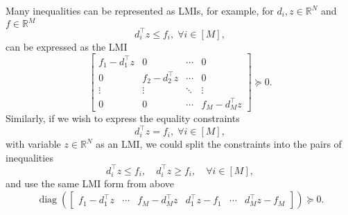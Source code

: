 \documentclass[a4paper]{article}
\DeclareMathOperator{\diag}{diag}
\begin{document}
Many inequalities can be represented as LMIs, for example, for $d_i,z\in\mathbb{R}^N$ and $f\in\mathbb{R}^M$
\begin{equation*}
d_i^\top z \le f_i,\;\forall i\in[M],
\end{equation*}
can be expressed as the LMI
\begin{equation*}
\begin{bmatrix}
f_1 - d_1^\top z &       0          & \cdots &    0   \\
      0          & f_2 - d_2^\top z & \cdots &    0   \\
   \vdots        &     \vdots       & \ddots & \vdots \\
      0          &       0          & \cdots & f_M - d_M^\top z
\end{bmatrix} \succeq 0.
\end{equation*}
Similarly, if we wish to express the equality constraints
\begin{equation*}
d_i^\top z = f_i,\;\forall i\in[M],
\end{equation*}
with variable $z\in\mathbb{R}^N$ as an LMI, we could split the constraints into the pairs of inequalities
\begin{equation*}
d_i^\top z \le f_i, \quad d_i^\top z \ge f_i,\quad\forall i\in[M],
\end{equation*}
and use the same LMI form from above
\begin{equation*}
\diag(\begin{bmatrix}f_1-d_1^\top z & \cdots & f_M-d_M^\top z & d_1^\top z - f_1 & \cdots & d_M^\top z - f_M \end{bmatrix}) \succeq 0.
\end{equation*}
\end{document}
